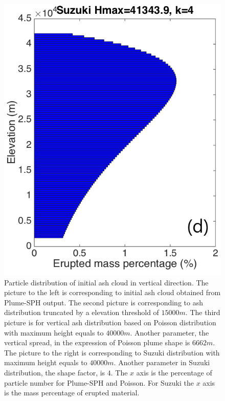 \documentclass[draft,linenumbers]{agujournal2019}
\begin{document}
\begin{figure}[!htb]
\begin{minipage}{.247 \textwidth}
    \end{minipage}%
    \begin{minipage}{.247 \textwidth}
        \centering
        \includegraphics[width=0.99 \textwidth]{Figures/Suzuki-Hmax40k-ParticleDis-z}
    \end{minipage}%
    \caption{Particle distribution of initial ash cloud in vertical direction. The picture to the left is corresponding to initial ash cloud obtained from Plume-SPH output. The second picture is corresponding to ash distribution truncated by a elevation threshold of $15000 m$. The third picture is for vertical ash distribution based on Poisson distribution with maximum height equals to $40000 m$. Another parameter, the vertical spread, in the expression of Poisson plume shape is $6662 m$. The picture to the right is corresponding to Suzuki distribution with maximum height equals to $40000 m$. Another parameter in Suzuki distribution, the shape factor, is $4$. The $x$ axis is the percentage of particle number for Plume-SPH and Poisson. For Suzuki the $x$ axis is the mass percentage of erupted material.}
    \label{fig:Particle-distribution-Plume-SPH-vs-semiempirical}
\end{figure}
\end{document}
